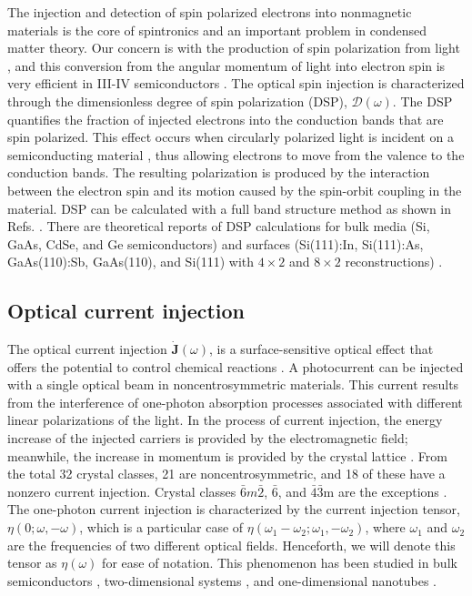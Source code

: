 \documentclass[pss]{wiley2sp} %
\begin{document}
The injection and detection of spin polarized electrons into nonmagnetic
materials is the core of spintronics \cite{vzuticRMP04,fertRMP08} and an
important problem in condensed matter theory. Our concern is with the
production of spin polarization from light \cite{LampelPRL68}, and this
conversion from the angular momentum of light into electron spin is very
efficient in III-IV semiconductors \cite{dyakonovOO84}. The optical spin
injection is characterized through the dimensionless degree of spin polarization (DSP),
$\boldsymbol{\mathcal{D}}(\omega)$. The DSP quantifies the fraction of injected
electrons into the conduction bands that are spin polarized. This effect
occurs when circularly polarized light is incident on a semiconducting
material \cite{dyakonovOO84}, thus allowing electrons to move from the valence
to the conduction bands. The resulting polarization is produced by the
interaction between the electron spin and its motion caused by the spin-orbit
coupling in the material. DSP can be calculated with a full band structure
method as shown in Refs. \cite{nastosPRB07,cabellosPRB09}. There are theoretical reports of DSP
calculations for bulk media (Si, GaAs, CdSe, and Ge semiconductors)
\cite{nastosPRB07,cabellosPRB09} and surfaces (Si(111):In, Si(111):As,
GaAs(110):Sb, GaAs(110), and Si(111) with $4\times2$ and $8\times2$
reconstructions) \cite{mendozaPRB12,arzatePRB14}.


\subsection{Optical current injection}

The optical current injection $\mathbf{\dot{J}}(\omega)$, is a surface-sensitive optical effect that offers the potential to control chemical reactions \cite{bhatPRB05,hachePRL97}. A photocurrent can be injected with a single optical beam in noncentrosymmetric materials. 
This current results from
the interference of one-photon absorption processes associated with different
linear polarizations of the light. In the process of current injection, the
energy increase of the injected carriers is provided by the electromagnetic
field; meanwhile, the increase in momentum is provided by the crystal lattice
\cite{arzatePRB14}. From the total 32 crystal classes, 21 are noncentrosymmetric, and 18 of these have a nonzero current injection. Crystal classes $\bar{6}m\bar{2}$, $\bar{6}$, and $\bar{4}$$\bar{3}$m are the exceptions \cite{sipePRB00}. The one-photon current injection is characterized by the current injection tensor, $\eta(0;\omega,−\omega)$, which is a particular case of $\eta(\omega_{1}-\omega_{2};\omega_{1},-\omega_{2})$, where $\omega_{1}$ and $\omega_{2}$ are the frequencies of two different optical fields. Henceforth, we will denote this tensor as $\eta(\omega)$ for ease of notation.
This phenomenon has been studied in bulk semiconductors
\cite{hachePRL97,sipePRB00}, two-dimensional systems
\cite{melePRB00,cabellosPRB11}, and one-dimensional nanotubes
\cite{melePRB00}. 
\end{document}
